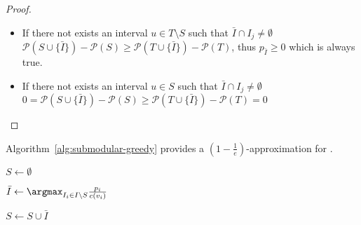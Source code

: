 \documentclass[11pt]{article} %
\begin{document}
\begin{proof}
\begin{itemize}
\item If there not exists an interval  \(u \in T\setminus S\) such that \(\bar{I} \cap I_j \neq \emptyset\)
\(
\mathcal{P}(S\cup\{\bar{I}\}) - \mathcal{P}(S) \geq \mathcal{P}(T\cup \{\bar{I}\}) - \mathcal{P}(T)
\), thus \(p_{\bar{I}} \geq 0\) which is always true.

\item If there not exists an interval  \(u \in S\) such that \(\bar{I} \cap I_j \neq \emptyset\)
\(
0 = \mathcal{P}(S\cup\{\bar{I}\}) - \mathcal{P}(S) \geq \mathcal{P}(T\cup \{\bar{I}\}) - \mathcal{P}(T) = 0
\)
\end{itemize}
\end{proof}

\begin{corollary}
Algorithm~\ref{alg:submodular-greedy} provides a $\left(1-\frac{1}{e}\right)$-approximation for \prob.
\end{corollary}

\begin{algorithm}[ht]
	$S \gets \emptyset$\;
	 {
		$\bar{I} \gets \argmax_{I_i \in I \setminus S} \frac{p_i}{c(v_i)}$\;
		
		 {
			$S \gets S \cup \bar{I}$\;
		}
	}
	\caption{\apxs}
	\label{alg:submodular-greedy}
\end{algorithm}
\end{document}
